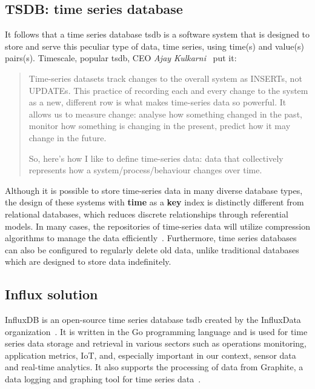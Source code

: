 \subsection{TSDB: time series database}
It follows that a time series database \acs{tsdb} is a software system that is designed to store and serve this peculiar type of data, time series, using time(s) and value(s) pairs(s).
Timescale, popular \ac{tsdb}, CEO \textit{Ajay Kulkarni}~\cite{Misc:asay_why_time_series} put it:
\begin{quote}
    Time-series datasets track changes to the overall system
    as INSERTs, not UPDATEs.
    This practice of recording each and every change to the system as a new, different row is what makes time-series data so powerful.
    It allows us to measure change: analyse how something changed in the past, monitor how something is changing in the present, predict how it may change in the future.

    So, here's how I like to define time-series data: data that collectively represents how a system/process/behaviour changes over time.
\end{quote}
Although it is possible to store time-series data in many diverse database types, the design of these systems with \textbf{time} as a \textbf{key} index is distinctly different from relational databases, which reduces discrete relationships through referential models.
In many cases, the repositories of time-series data will utilize compression algorithms to manage the data efficiently~\cite{Book:devops_cookbook}. Furthermore, time series databases can also be configured to regularly delete old data, unlike traditional databases which are designed to store data indefinitely.

\subsection{Influx solution}
InfluxDB is an open-source time series database \acs{tsdb} created by the InfluxData organization~\cite{Misc:influxdata_website}.
It is written in the Go programming language and is used for time series data storage and retrieval in various sectors such as operations monitoring, application metrics, \acl{IoT}, and, especially important in our context, sensor data and real-time analytics.
It also supports the processing of data from Graphite, a data logging and graphing tool for time series data~\cite{Misc:thegraphiteproject_2021_graphite}.

